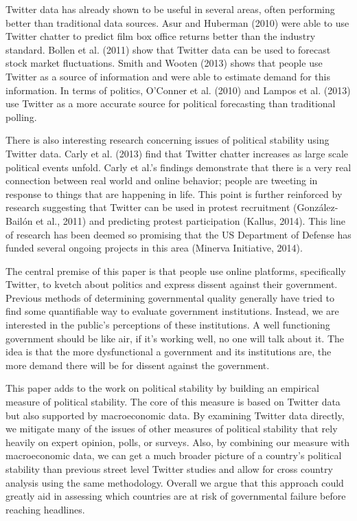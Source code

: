 \documentclass[12pt]{article}
\begin{document}
\begin{spacing}{1.5}
Twitter data has already shown to be useful in several areas, often performing better than traditional data sources. Asur and Huberman (2010) were able to use Twitter chatter to predict film box office returns better than the industry standard. Bollen et al. (2011) show that Twitter data can be used to forecast stock market fluctuations. Smith and Wooten (2013) shows that people use Twitter as a source of information and were able to estimate demand for this information. In terms of politics, O'Conner et al. (2010) and Lampos et al. (2013) use Twitter as a more accurate source for political forecasting than traditional polling. 

There is also interesting research concerning issues of political stability using Twitter data. Carly et al. (2013) find that Twitter chatter increases as large scale political events unfold. Carly et al.'s findings demonstrate that there is a very real connection between real world and online behavior; people are tweeting in response to things that are happening in life. This point is further reinforced by research suggesting that Twitter can be used in protest recruitment (Gonz{\'a}lez-Bail{\'o}n et al., 2011) and predicting protest participation (Kallus, 2014). This line of research has been deemed so promising that the US Department of Defense has funded several ongoing projects in this area (Minerva Initiative, 2014).  

The central premise of this paper is that people use online platforms, specifically Twitter, to kvetch about politics and express dissent against their government. Previous methods of determining governmental quality generally have tried to find some quantifiable way to evaluate government institutions. Instead, we are interested in the public's perceptions of these institutions. A well functioning government should be like air, if it's working well, no one will talk about it. The idea is that the more dysfunctional a government and its institutions are, the more demand there will be for dissent against the government.  

This paper adds to the work on political stability by building an empirical measure of political stability. The core of this measure is based on Twitter data but also supported by macroeconomic data. By examining Twitter data directly, we mitigate many of the issues of other measures of political stability that rely heavily on expert opinion, polls, or surveys. Also, by combining our measure with macroeconomic data, we can get a much broader picture of a country's political stability than previous street level Twitter studies and allow for cross country analysis using the same methodology. Overall we argue that this approach could greatly aid in assessing which countries are at risk of governmental failure before reaching headlines.   


\end{spacing}
\end{document}
